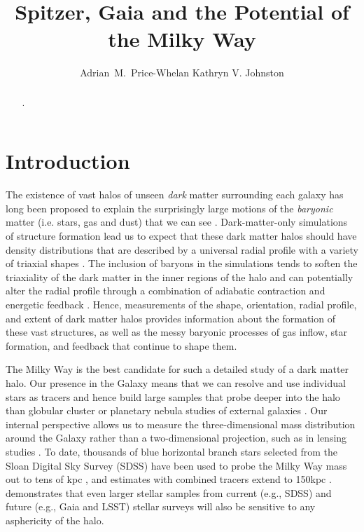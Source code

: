 \documentclass[preprint]{aastex}
\begin{document}
\title{Spitzer, Gaia and the Potential of the Milky Way}

\author{Adrian~M.~Price-Whelan Kathryn V. Johnston}


\begin{abstract}
.
\end{abstract}


\section{Introduction}
\label{intro.sec}
 The existence of vast halos of unseen {\it dark} matter surrounding each galaxy has long been proposed to explain the surprisingly large
motions of the {\it baryonic} matter (i.e. stars, gas and dust) that we can see \citep[e.g.,][]{zwicky37,rubin70}.
Dark-matter-only simulations of structure formation lead us to expect that these dark matter halos should have density distributions that are described by a universal radial profile \citep{navarro96} with a variety of triaxial shapes \citep{jing02}.
The inclusion of baryons in the simulations tends to soften the triaxiality of the dark matter in the inner regions of the halo \citep[e.g., as the disk forms,][]{bailin05} and
can potentially alter the radial profile through a combination of adiabatic contraction and energetic feedback \citep[see recent discussion by][]{pontzen12}.
Hence, measurements of the shape, orientation, radial profile, and extent of dark matter halos provides information about the formation of these vast structures, as well as the messy baryonic processes of gas inflow, star formation, and feedback that continue to shape them.

The Milky Way is the best candidate for such a detailed study of a dark matter halo. 
Our presence in the Galaxy means that we can resolve and use individual stars as tracers and hence build large samples that probe deeper into the halo than globular cluster
or planetary nebula studies of external galaxies \citep[e.g.][]{mendez01,cote03}. Our internal perspective allows us to measure the three-dimensional mass distribution around the Galaxy rather than a two-dimensional projection, such as in lensing studies \citep{bolton06}.
To date, thousands of blue horizontal branch stars selected from the Sloan Digital Sky Survey (SDSS) have been used to probe the Milky Way mass out to tens of
kpc \citep[SDSS, see][]{deason12a,kafle12}, and estimates with combined tracers extend to 150kpc \citep{deason12b}.
\citet{loebman12} demonstrates that even larger stellar samples from current (e.g., SDSS) and future  (e.g., Gaia and LSST) stellar surveys will also be sensitive to any
asphericity of the halo.
\end{document}
